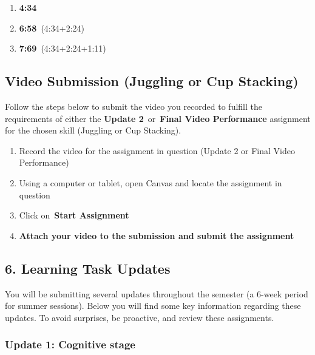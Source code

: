 \documentclass[
  letterpaper,
  DIV=11,
  numbers=noendperiod]{scrartcl}
\providecommand{\tightlist}{%
  \setlength{\itemsep}{0pt}\setlength{\parskip}{0pt}}\usepackage{longtable,booktabs,array}
\begin{document}
\begin{enumerate}
  \begin{enumerate}
  \def\labelenumii{\arabic{enumii}.}
  \tightlist
  \item
    \textbf{4:34}
  \item
    \textbf{6:58}~(4:34+2:24)
  \item
    \textbf{7:69}~(4:34+2:24+1:11)
  \end{enumerate}
\end{enumerate}

\hypertarget{video-submission-juggling-or-cup-stacking}{%
\subsection{Video Submission (Juggling or Cup
Stacking)}\label{video-submission-juggling-or-cup-stacking}}

Follow the steps below to submit the video you recorded to fulfill the
requirements of either the \textbf{Update 2}~or~\textbf{Final Video
Performance} assignment for the chosen skill (Juggling or Cup Stacking).

\begin{enumerate}
\def\labelenumi{\arabic{enumi}.}
\item
  Record the video for the assignment in question (Update 2 or Final
  Video Performance)
\item
  Using a computer or tablet, open Canvas and locate the assignment in
  question
\item
  Click on~\textbf{Start Assignment}
\item
  \textbf{Attach your video to the submission and submit the assignment}
\end{enumerate}

\hypertarget{learning-task-updates}{%
\subsection{6. Learning Task Updates}\label{learning-task-updates}}

You will be submitting several updates throughout the semester (a 6-week
period for summer sessions). Below you will find some key information
regarding these updates. To avoid surprises, be proactive, and review
these assignments.

\hypertarget{update-1-cognitive-stage}{%
\subsubsection{Update 1: Cognitive
stage}\label{update-1-cognitive-stage}}
\end{document}
